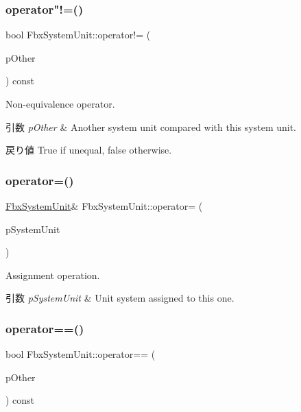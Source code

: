 \subsubsection{\texorpdfstring{operator"!=()}{operator!=()}}
{\footnotesize\ttfamily bool Fbx\+System\+Unit\+::operator!= (\begin{DoxyParamCaption}\item[{const \hyperlink{class_fbx_system_unit}{Fbx\+System\+Unit} \&}]{p\+Other }\end{DoxyParamCaption}) const}

Non-\/equivalence operator. 
\begin{DoxyParams}{引数}
{\em p\+Other} & Another system unit compared with this system unit. \\
\hline
\end{DoxyParams}
\begin{DoxyReturn}{戻り値}
{\ttfamily True} if unequal, {\ttfamily false} otherwise. 
\end{DoxyReturn}
\mbox{\label{class_fbx_system_unit_a91610b2403fd3fdbd0988123cd21eb50}} 
\subsubsection{\texorpdfstring{operator=()}{operator=()}}
{\footnotesize\ttfamily \hyperlink{class_fbx_system_unit}{Fbx\+System\+Unit}\& Fbx\+System\+Unit\+::operator= (\begin{DoxyParamCaption}\item[{const \hyperlink{class_fbx_system_unit}{Fbx\+System\+Unit} \&}]{p\+System\+Unit }\end{DoxyParamCaption})}

Assignment operation. 
\begin{DoxyParams}{引数}
{\em p\+System\+Unit} & Unit system assigned to this one. \\
\hline
\end{DoxyParams}
\mbox{\label{class_fbx_system_unit_a28f701aa2d2df44e7b89d10e66a1d892}} 
\subsubsection{\texorpdfstring{operator==()}{operator==()}}
{\footnotesize\ttfamily bool Fbx\+System\+Unit\+::operator== (\begin{DoxyParamCaption}\item[{const \hyperlink{class_fbx_system_unit}{Fbx\+System\+Unit} \&}]{p\+Other }\end{DoxyParamCaption}) const}

